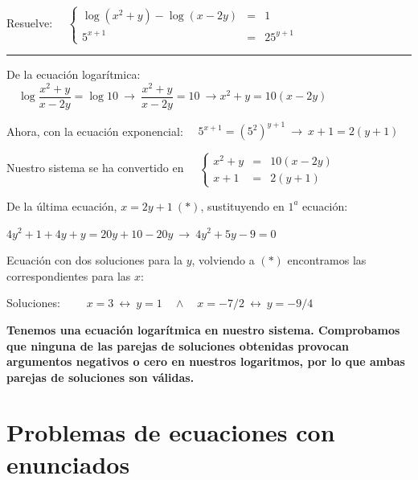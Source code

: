 \begin{miejercicio}

Resuelve: $\quad \left\{ \begin{array}{ccc} \log(x^2+y)-\log(x-2y)&=&1 \\ 5^{x+1}&=&25^{y+1} \end{array} \right.$

\rule{250pt}{0.1pt}

\vspace{2mm} \begin{small} De la ecuación logarítmica: $\quad \log \dfrac{x^2+y}{x-2y}=\log 10 \ \to \ \dfrac{x^2+y}{x-2y}=10 \ \to x^2+y=10(x-2y)$ \end{small}

\vspace{2mm} Ahora, con la ecuación exponencial: $\quad 5^{x+1}=(5^2)^{y+1}\ \to \ x+1=2(y+1)$

\vspace{2mm}  Nuestro sistema se ha convertido en $\quad \left\{ \begin{array}{rrr} x^2+y&=&10(x-2y) \\ x+1&=&2(y+1) \end{array} \right.$

\vspace{2mm}  De la última ecuación, $x=2y+1 \ (*)$, sustituyendo en $1^a$ ecuación:

\vspace{2mm} $4y^2+1+4y+y=20y+10-20y \ \to \ 4y^2+5y-9=0$ 

\vspace{2mm} Ecuación con dos soluciones para la $y$, volviendo a $(*)$ encontramos las correspondientes para las $x$:

\vspace{2mm} Soluciones: $\qquad x=3 \ \leftrightarrow \ y=1 \quad \wedge \quad x=-7/2 \ \leftrightarrow \ y=-9/4$

\vspace{2mm} \textbf{Tenemos una ecuación logarítmica en nuestro sistema. Comprobamos que ninguna de las parejas de soluciones obtenidas provocan argumentos negativos o cero en nuestros logaritmos, por lo que ambas parejas de soluciones son válidas.}
	
\end{miejercicio}



\vspace{1cm}
\section{Problemas de ecuaciones con enunciados}
\vspace{0.5cm}


